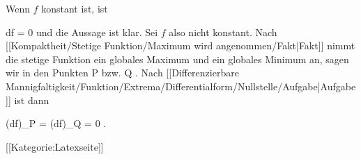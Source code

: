 Wenn $f$ konstant ist, ist

\mavergleichskette
{\vergleichskette
{ df
}
{ = }{ 0
}
{  }{
}
{    }{
}
{   }{
}
}
{}{}{}
und die Aussage ist klar. Sei $f$ also nicht konstant. Nach
[[Kompaktheit/Stetige Funktion/Maximum wird angenommen/Fakt|Fakt]]
nimmt die stetige Funktion ein globales Maximum und ein globales Minimum an, sagen wir in den Punkten
\mathkor {} {P} {bzw.} {Q} {.}
Nach
[[Differenzierbare Mannigfaltigkeit/Funktion/Extrema/Differentialform/Nullstelle/Aufgabe|Aufgabe]]
ist dann

\mavergleichskettedisp
{\vergleichskette
{ (df)_P
}
{ =} { (df)_Q
}
{ =} { 0
}
{ } {
}
{ } {
}
}
{}{}{.}

 [[Kategorie:Latexseite]]
